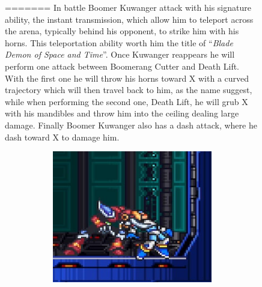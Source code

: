\begin{figure}[htp]
=======
In battle Boomer Kuwanger attack with his signature ability, the instant transmission, which allow him to teleport across the arena, typically behind his opponent, to strike him with his horns. This teleportation ability worth him the title of  ``\textit{Blade Demon of Space and Time}''\cite{book:MMX_Complete_art}. Once Kuwanger reappears he will perform one attack between Boomerang Cutter and Death Lift. With the first one he will throw his horns toward X with a curved trajectory which will then travel back to him, as the name suggest, while when performing the second one, Death Lift, he will grub X with his mandibles and throw him into the ceiling dealing large damage. Finally Boomer Kuwanger also has a dash attack, where he dash toward X to damage him.
 \begin{figure}[htp]
	\centering
	\begin{subfigure}{0.4\linewidth}
		\centering
		\includegraphics[width=\linewidth]{figures/X1/Boomer_lift_1.jpg}
		\caption{}
	\end{subfigure}
	\begin{subfigure}{0.3\linewidth}
		\centering

\end{subfigure}
\end{figure}
\end{figure}
